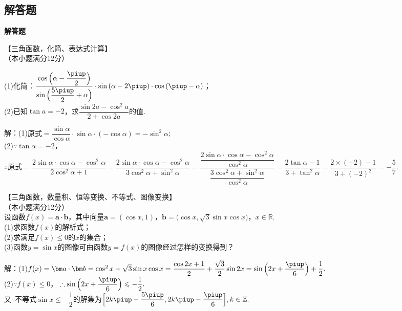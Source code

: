   \subsection{解答题}
  \begin{exercise}{\bf 解答题}
    \item 【三角函数，化简、表达式计算】\\
      （本小题满分12分）\par
      (1)化简：$\dfrac{\cos{\Bigl(\alpha-\dfrac{\piup}2\Bigr)}}{\sin{\Bigl(\dfrac{5\piup}2+\alpha\Bigr)}}\cdot\sin{(\alpha-2\piup)}\cdot\cos{(\piup-\alpha)}$；\\
      (2)已知$\tan{a}=-2$，求$\dfrac{\sin{2a}-\cos^2{a}}{2+\cos{2a}}$的值.
      \begin{answer}
      解：(1)$\text{原式}=\dfrac{\sin\alpha}{\cos\alpha}\cdot\sin\alpha\cdot(-\cos\alpha)=-\sin^2\alpha$;\\
      (2)$\because\tan\alpha=-2$，
      $\therefore\text{原式}=\dfrac{2\sin\alpha\cdot\cos\alpha-\cos^2\alpha}{2\cos^2\alpha+1}
      =\dfrac{2\sin\alpha\cdot\cos\alpha-\cos^2\alpha}{3\cos^2\alpha+\sin^2\alpha}
      =\dfrac{\dfrac{2\sin\alpha\cdot\cos\alpha-\cos^2\alpha}{\cos^2\alpha}}{\dfrac{3\cos^2\alpha+\sin^2\alpha}{\cos^2\alpha}}
      =\dfrac{2\tan\alpha-1}{3+\tan^2\alpha}=\dfrac{2\times(-2)-1}{3+(-2)^2}
      =-\dfrac{5}{7}.$
      \end{answer}
    \item 【三角函数，数量积、恒等变换、不等式、图像变换】\\
      （本小题满分12分）\\
      设函数$f(x)=\bm a\cdot\bm b$，其中向量$\bm a=(\cos x,1)$，$\bm b=\bigl(\cos x,\sqrt3\sin x\cos x\bigr)$，$x\in\mathbb{R}$.\\
      (1)求函数$f(x)$的解析式；\\
      (2)求满足$f(x)\leqslant0$的$x$的集合；\\
      (3)函数$y=\sin x$的图像可由函数$y=f(x)$的图像经过怎样的变换得到？
      \begin{answer}
        解：(1)$f(x)=\bm a\cdot\bm b
        =\cos^2x+\sqrt3\sin x\cos x
        =\dfrac{\cos{2x}+1}2+\dfrac{\sqrt3}{2}\sin{2x}
        =\sin{\Bigl(2x+\dfrac{\piup}6\Bigr)}+\dfrac12.$\\
        (2)$\because f(x)\leqslant0$，
        $\therefore \sin{\Bigl(2x+\dfrac{\piup}6\Bigr)}\leqslant-\dfrac12.$\\
        又$\because$不等式$\sin x\leqslant-\dfrac12$的解集为$\Bigl[2k\piup-\dfrac{5\piup}6,2k\piup-\dfrac{\piup}6\Bigr],k\in\mathbb{Z}.$\\

\end{answer}
\end{exercise}
